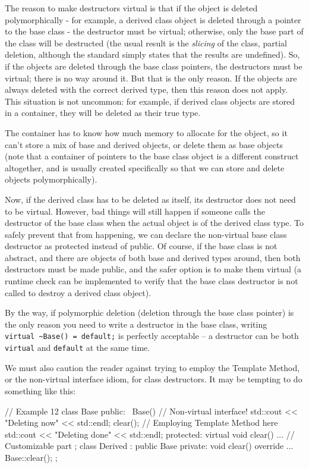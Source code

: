 The reason to make destructors virtual is that if the object is deleted polymorphically - for example, a derived class object is deleted through a pointer to the base class - the destructor must be virtual; otherwise, only the base part of the class will be destructed (the usual result is the \emph{slicing} of the class, partial deletion, although the standard simply states that the results are undefined). So, if the objects are deleted through the base class pointers, the destructors must be virtual; there is no way around it. But that is the only reason. If the objects are always deleted with the correct derived type, then this reason does not apply. This situation is not uncommon: for example, if derived class objects are stored in a container, they will be deleted as their true type.

The container has to know how much memory to allocate for the object, so it can't store a mix of base and derived objects, or delete them as base objects (note that a container of pointers to the base class object is a different construct altogether, and is usually created specifically so that we can store and delete objects polymorphically).

Now, if the derived class has to be deleted as itself, its destructor does not need to be virtual. However, bad things will still happen if someone calls the destructor of the base class when the actual object is of the derived class type. To safely prevent that from happening, we can declare the non-virtual base class destructor as protected instead of public. Of course, if the base class is not abstract, and there are objects of both base and derived types around, then both destructors must be made public, and the safer option is to make them virtual (a runtime check can be implemented to verify that the base class destructor is not called to destroy a derived class object).

By the way, if polymorphic deletion (deletion through the base class pointer) is the only reason you need to write a destructor in the base class, writing \texttt{virtual\ \textasciitilde{}Base()\ =\ default;} is perfectly acceptable -- a destructor can be both \texttt{virtual} and \texttt{default} at the same time.

We must also caution the reader against trying to employ the Template Method, or the non-virtual interface idiom, for class destructors. It may be tempting to do something like this:

\begin{code}
// Example 12
class Base {
  public:
  ~Base() { // Non-virtual interface!
    std::cout << "Deleting now" << std::endl;
    clear(); // Employing Template Method here
    std::cout << "Deleting done" << std::endl;
  }
  protected:
  virtual void clear() { ... } // Customizable part
};
class Derived : public Base {
  private:
  void clear() override {
    ...
    Base::clear();
  }
};
\end{code}

